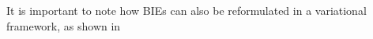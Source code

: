 It is important to note how \glspl{BIE} can also be reformulated in a
variational framework, as shown in 

\begin{comment}

\section{The Galerkin Method}

\todo[inline]{Write this section}
Approximability, conformity, consistency and asymptotic consistency
of the approximation setting, $\inf$-$\sup$ condition, Céa's Lemma
and generalized $\inf$-$\sup$ condition.~\autocite{Ern2004-oo}

\section{Mixed Blabbering}


\end{comment}
